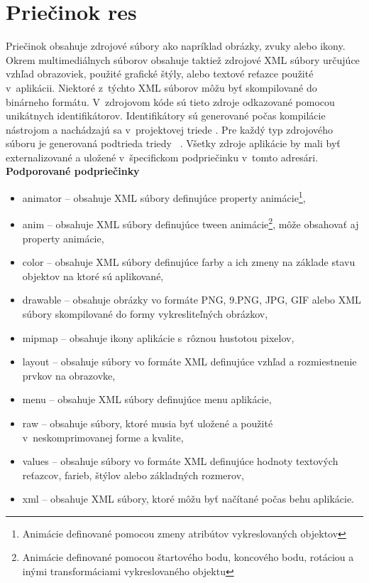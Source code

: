 \section{Priečinok res}
\label{res}
Priečinok  obsahuje zdrojové súbory ako napríklad obrázky, zvuky alebo ikony. Okrem multimediálnych súborov obsahuje taktiež zdrojové XML súbory určujúce vzhľad obrazoviek, použité grafické štýly, alebo textové reťazce použité v~aplikácii. Niektoré z~týchto XML súborov môžu byť skompilované do binárneho formátu. V~zdrojovom kóde sú tieto zdroje odkazované pomocou unikátnych identifikátorov. Identifikátory sú generované počas kompilácie nástrojom  a nachádzajú sa v~projektovej triede . Pre každý typ zdrojového súboru je generovaná podtrieda triedy ~\cite{accessingRes}. Všetky zdroje aplikácie by mali byť externalizované a uložené v~špecifickom podpriečinku v~tomto adresári.\newpage
\textbf{Podporované podpriečinky}~\cite{providingRes}
\begin{itemize}
\item animator -- obsahuje XML súbory definujúce property animácie\footnote{Animácie definované pomocou zmeny atribútov vykreslovaných objektov},
\item anim -- obsahuje XML súbory definujúce tween animácie\footnote{Animácie definované pomocou štartového bodu, koncového bodu, rotáciou a inými transformáciami vykreslovaného objektu}, môže obsahovať aj property animácie,
\item color -- obsahuje XML súbory definujúce farby a ich zmeny na základe stavu objektov na ktoré sú aplikované,
\item drawable -- obsahuje obrázky vo formáte PNG, 9.PNG, JPG, GIF alebo XML súbory skompilované do formy vykresliteľných obrázkov,
\item mipmap -- obsahuje ikony aplikácie s~rôznou hustotou pixelov,
\item layout -- obsahuje súbory vo formáte XML definujúce vzhľad a rozmiestnenie prvkov na obrazovke,
\item menu -- obsahuje XML súbory definujúce menu aplikácie,
\item raw -- obsahuje súbory, ktoré musia byť uložené a použité v~neskomprimovanej forme a kvalite,
\item values -- obsahuje súbory vo formáte XML definujúce hodnoty textových reťazcov, farieb, štýlov alebo základných rozmerov,
\item xml -- obsahuje XML súbory, ktoré môžu byť načítané počas behu aplikácie.
\end{itemize}

